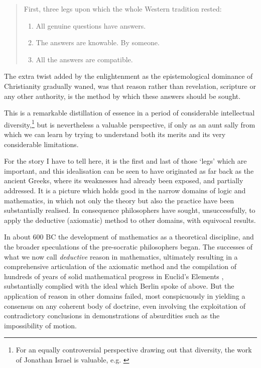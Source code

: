 \documentclass[10pt,titlepage]{book}
\begin{document}
\begin{quotation}

First, three legs upon which the whole Western tradition rested:
\begin{enumerate}
\item All genuine questions have answers.
\item The answers are knowable.  By someone.
\item All the answers are compatible.
\end{enumerate}
\end{quotation}

The extra twist added by the enlightenment as the epistemological dominance of Christianity gradually waned, was that reason rather than revelation, scripture or any other authority, is the method by which these answers should be sought.

This is a remarkable distillation of essence in a period of considerable intellectual diversity,\footnote{For an equally controversial perspective drawing out that diversity, the work of Jonathan Israel is valuable, e.g. \cite{israel2002radical, israel2013democratic}}%
 but is nevertheless a valuable perspective, if only as an aunt sally from which we can learn by trying to understand both its merits and its very considerable limitations.

For the story I have to tell here, it is the first and last of those `legs' which are important, and this idealisation can be seen to have originated as far back as the ancient Greeks, where its weaknesses had already been exposed, and partially addressed.
It is a picture which holds good in the narrow domains of logic and mathematics, in which not only the theory but also the practice have been substantially realised.
In consequence philosophers have sought, unsuccessfully, to apply the deductive (axiomatic) method to other domains, with equivocal results.

In about 600 BC the development of mathematics as a theoretical discipline, and the broader speculations of the pre-socratic philosophers began.
The successes of what we now call \emph{deductive} reason in mathematics, ultimately resulting in a comprehensive articulation of the axiomatic method and the compilation of hundreds of years of solid mathematical progress in Euclid's Elements \cite{euclidEL1}, substantially complied with the ideal which Berlin spoke of above.
But the application of reason in other domains failed, most conspicuously in yielding a consensus on any coherent body of doctrine, even involving the exploitation of contradictory conclusions in demonstrations of absurdities such as the impossibility of motion.
\end{document}
